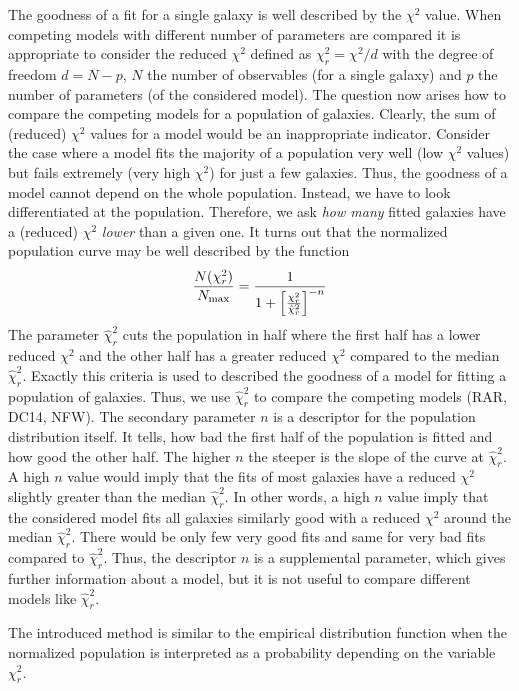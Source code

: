 The goodness of a fit for a single galaxy is well described by the $\chi^2$ value. When competing models with different number of parameters are compared it is appropriate to consider the reduced $\chi^2$ defined as $\chi_r^2 = \chi^2/d$ with the degree of freedom $d = N-p$, $N$ the number of observables (for a single galaxy) and $p$ the number of parameters (of the considered model). The question now arises how to compare the competing models for a population of galaxies. Clearly, the sum of (reduced) $\chi^2$ values for a model would be an inappropriate indicator. Consider the case where a model fits the majority of a population very well (low $\chi^2$ values) but fails extremely (very high $\chi^2$) for just a few galaxies. Thus, the goodness of a model cannot depend on the whole population. Instead, we have to look differentiated at the population. Therefore, we ask \textit{how many} fitted galaxies have a (reduced) $\chi^2$ \textit{lower} than a given one. It turns out that the normalized population curve may be well described by the function \begin{equation}
	\label{eqn:population}
	\frac{N(\chi_r^2)}{N_{\rm max}} = \frac{1}{1 + \qbracket{\frac{\chi_r^2}{\hat\chi_r^2}}^{-n}}
\end{equation} The parameter $\hat \chi_r^2$ cuts the population in half where the first half has a lower reduced $\chi^2$ and the other half has a greater reduced $\chi^2$ compared to the median $\hat \chi_r^2$. Exactly this criteria is used to described the goodness of a model for fitting a population of galaxies. Thus, we use $\hat \chi_r^2$ to compare the competing models (RAR, DC14, NFW). The secondary parameter $n$ is a descriptor for the population distribution itself. It tells, how bad the first half of the population is fitted and how good the other half. The higher $n$ the steeper is the slope of the curve at $\hat \chi_r^2$. A high $n$ value would imply that the fits of most galaxies have a reduced $\chi^2$ slightly greater than the median $\hat \chi_r^2$. In other words, a high $n$ value imply that the considered model fits all galaxies similarly good with a reduced $\chi^2$ around the median $\hat \chi_r^2$. There would be only few very good fits and same for very bad fits compared to $\hat \chi_r^2$. Thus, the descriptor $n$ is a supplemental parameter, which gives further information about a model, but it is not useful to compare different models like $\hat \chi_r^2$.

The introduced method is similar to the empirical distribution function when the normalized population is interpreted as a probability depending on the variable $\chi_r^2$.

